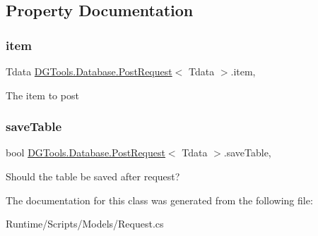 \subsection{Property Documentation}
\mbox{\label{class_d_g_tools_1_1_database_1_1_post_request_a448a29ab2dfd1c7782a20dfb7a176ba0}} 
\subsubsection{\texorpdfstring{item}{item}}
{\footnotesize\ttfamily Tdata \mbox{\hyperlink{class_d_g_tools_1_1_database_1_1_post_request}{D\+G\+Tools.\+Database.\+Post\+Request}}$<$ Tdata $>$.item\hspace{0.3cm}{\ttfamily [get]}, {}}



The item to post 

\mbox{\label{class_d_g_tools_1_1_database_1_1_post_request_a3e1f964184fd236c45e10e141f14d3e1}} 
\subsubsection{\texorpdfstring{saveTable}{saveTable}}
{\footnotesize\ttfamily bool \mbox{\hyperlink{class_d_g_tools_1_1_database_1_1_post_request}{D\+G\+Tools.\+Database.\+Post\+Request}}$<$ Tdata $>$.save\+Table\hspace{0.3cm}{\ttfamily [get]}, {}}



Should the table be saved after request? 



The documentation for this class was generated from the following file\+:\begin{DoxyCompactItemize}
\item 
Runtime/\+Scripts/\+Models/Request.\+cs\end{DoxyCompactItemize}
